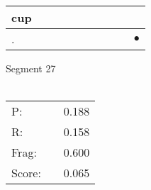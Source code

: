 \documentclass[landscape]{article}
\newcommand{\ssp}{\hspace{2pt}}
\newcommand{\mex}{\cellcolor{g}$\bullet$}
\begin{document}
\begin{tabular}{|l|p{10pt}|p{10pt}|p{10pt}|p{10pt}|p{10pt}|p{10pt}|p{10pt}|p{10pt}|p{10pt}|}
\hline
\ssp cup \ssp&\hspace{2pt}&\hspace{2pt}&\hspace{2pt}&\hspace{2pt}&\hspace{2pt}&\hspace{2pt}&\hspace{2pt}&\hspace{2pt}&\hspace{2pt}\\
\hline
\ssp \cellcolor{ref8}. \ssp&\hspace{2pt}&\hspace{2pt}&\hspace{2pt}&\hspace{2pt}&\hspace{2pt}&\hspace{2pt}&\hspace{2pt}&\hspace{2pt}&\hspace{2pt}\mex\\
\hline
\end{tabular}

\vspace{6pt}
\noindent Segment 27\\\\
\noindent\begin{tabular}{lm{12pt}r}
\hline
P:&&0.188\\
R:&&0.158\\
Frag:&&0.600\\
Score:&&0.065\\
\end{tabular}

\newpage
\end{document}
